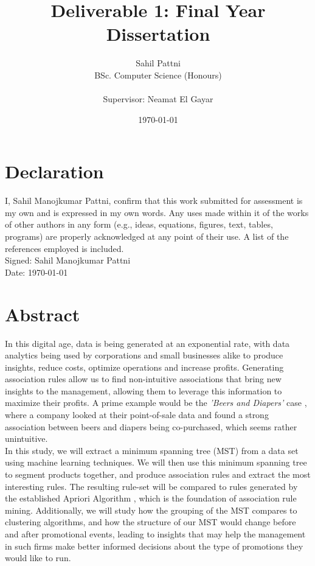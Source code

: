 \documentclass[a4paper,11pt]{article}
\begin{document}
\title{Deliverable 1: Final Year Dissertation}
\author{
	Sahil Pattni\\ 
	BSc. Computer Science (Honours)\\\\
	Supervisor: Neamat El Gayar
	}
\date{\today}
\maketitle
{}
\newpage
\section*{Declaration}
I, Sahil Manojkumar Pattni, confirm that this work submitted for assessment is my own and is expressed in my own words. Any uses made within it of the works of other authors in any form (e.g., ideas, equations, figures, text, tables, programs) are properly acknowledged at any point of their use. A list of the references employed is included. 
\\
Signed: Sahil Manojkumar Pattni\\
Date: \today


\section*{Abstract}
In this digital age, data is being generated at an exponential rate, with data analytics being used by corporations and small businesses alike to produce insights, reduce costs, optimize operations and increase profits.  Generating association rules allow us to find non-intuitive associations that bring new insights to the management, allowing them to leverage this information to maximize their profits. A prime example would be the \textit{'Beers and Diapers'} case \cite{beers_diapers}, where a company looked at their point-of-sale data and found a strong association between beers and diapers being co-purchased, which seems rather unintuitive.
\\In this study, we will extract a minimum spanning tree (MST) from a data set using machine learning techniques. We will then use this minimum spanning tree to segment products together,  and produce association rules and extract the most interesting rules. The resulting rule-set will be compared to rules generated by the established Apriori Algorithm \cite{apriori}, which is the foundation of association rule mining.  Additionally, we will study how the grouping of the MST compares to clustering algorithms, and how the structure of our MST would change before and after promotional events, leading to insights that may help the management in such firms make better informed decisions about the type of promotions they would like to run.
\end{document}
